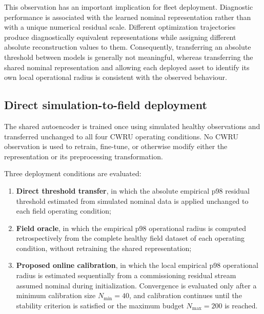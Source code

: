 \documentclass[numbered]{trbunofficial}
\begin{document}
This observation has an important implication for fleet deployment.
Diagnostic performance is associated with the learned nominal
representation rather than with a unique numerical residual scale.
Different optimization trajectories produce diagnostically equivalent
representations while assigning different absolute reconstruction values to
them. Consequently, transferring an absolute threshold between models is
generally not meaningful, whereas transferring the shared nominal
representation and allowing each deployed asset to identify its own local
operational radius is consistent with the observed behaviour.

\subsection{Direct simulation-to-field deployment}
\label{sec:shared-deployment-results}

The shared autoencoder is trained once using simulated healthy observations
and transferred unchanged to all four CWRU operating conditions. No CWRU
observation is used to retrain, fine-tune, or otherwise modify either the
representation or its preprocessing transformation.

Three deployment conditions are evaluated:

\begin{enumerate}[leftmargin=1.5em]

    \item \textbf{Direct threshold transfer}, in which the absolute empirical
    p98 residual threshold estimated from simulated nominal data is applied
    unchanged to each field operating condition;

    \item \textbf{Field oracle}, in which the empirical p98 operational radius
    is computed retrospectively from the complete healthy field dataset of
    each operating condition, without retraining the shared representation;

    \item \textbf{Proposed online calibration}, in which the local empirical
    p98 operational radius is estimated sequentially from a commissioning
    residual stream assumed nominal during initialization. Convergence is
    evaluated only after a minimum calibration size $N_{\min}=40$, and
    calibration continues until the stability criterion is satisfied or the
    maximum budget $N_{\max}=200$ is reached.
\end{enumerate}
\end{document}
